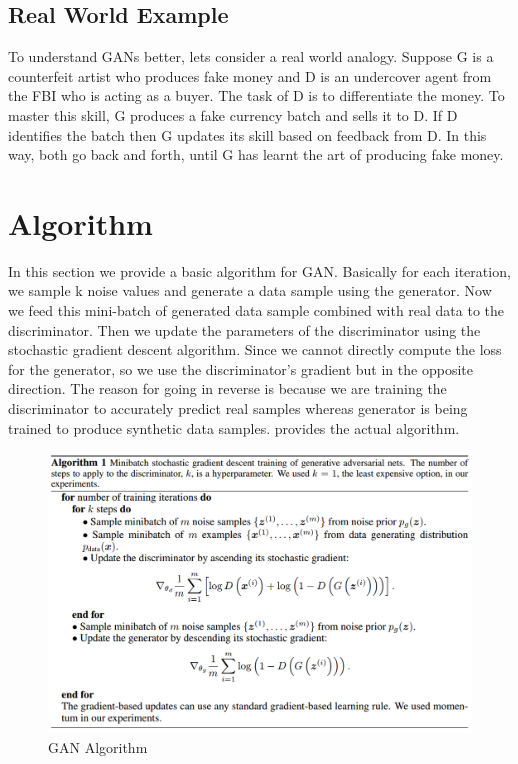 \subsection{Real World Example}
To understand GANs better, lets consider a real world analogy. Suppose G is a counterfeit artist who produces fake money and D is an undercover agent from the FBI who is acting as a buyer. The task of D is to differentiate the money. To master this skill, G produces a fake currency batch and sells it to D. If D identifies the batch then G updates its skill based on feedback from D. %
In this way, both go back and forth, until G has learnt the art of producing fake money.
\section{Algorithm}
In this section we provide a basic algorithm for GAN. Basically for each iteration, we sample k noise values and generate a data sample using the generator. Now we feed this mini-batch of generated data sample combined with real data to the discriminator. Then we update the parameters of the discriminator using the stochastic gradient descent algorithm. Since we cannot directly compute the loss for the generator, so we use the discriminator's gradient but in the opposite direction. The reason for going in reverse is because we are training the discriminator to accurately predict real samples whereas generator is being trained to produce synthetic data samples.  provides the actual algorithm.
\begin{figure}[!htb]

  \centering
    \includegraphics[scale=.4, angle=0]{Files/Algorithm.png}
    \caption[Vanilla GAN Algorithm]{ GAN Algorithm \cite{Gan-overview}}
    \label{fig:GAN Algorithm}
\end{figure}

